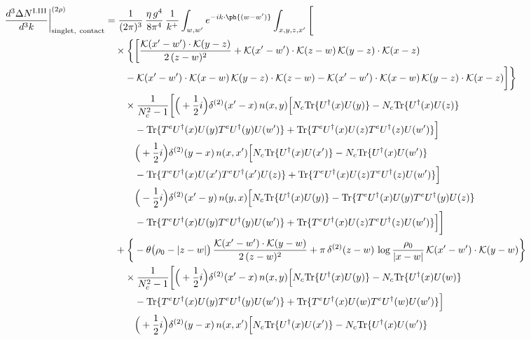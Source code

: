 \begin{align}
\frac{d^{3}\Delta N^{\rm I.III}}{d^{3}k}\bigg|^{(2\rho)}_{\rm singlet,\ contact}&=\frac{1}{(2\pi)^{3}}\,\frac{\eta\,g^{4}}{8\pi^{4}}\,\frac{1}{k^{+}}\int_{w,w'}e^{-ik\cdot\ph{(w-w')}}\int_{x,y,z,x'}\Bigg[\notag\\
&\quad\times\bigg\{\bigg[\frac{\mathcal{K}(x'-w')\cdot\mathcal{K}(y-z)}{2\,(z-w)^{2}}+\mathcal{K}(x'-w')\cdot\mathcal{K}(z-w)\,\mathcal{K}(y-z)\cdot\mathcal{K}(x-z)\notag\\
&\qquad-\mathcal{K}(x'-w')\cdot\mathcal{K}(x-w)\,\mathcal{K}(y-z)\cdot\mathcal{K}(z-w)-\mathcal{K}(x'-w')\cdot\mathcal{K}(x-w)\,\mathcal{K}(y-z)\cdot\mathcal{K}(x-z)\bigg]\bigg\}\notag\\
&\qquad\times \frac{1}{N_{c}^{2}-1}\bigg[\Big(+\frac{1}{2}i\Big)\delta^{(2)}(x'-x)\,n(x,y)\Big[N_{c}{\rm Tr}\{U^{\dagger}(x)U(y)\}-N_{c}{\rm Tr}\{U^{\dagger}(x)U(z)\}\notag\\
&\qquad\quad -{\rm Tr}\{T^{e}U^{\dagger}(x)U(y)T^{e}U^{\dagger}(y)U(w')\}+{\rm Tr}\{T^{e}U^{\dagger}(x)U(z)T^{e}U^{\dagger}(z)U(w')\}\Big]\notag\\
&\qquad\quad \Big(+\frac{1}{2}i\Big)\delta^{(2)}(y-x)\,n(x,x')\Big[N_{c}{\rm Tr}\{U^{\dagger}(x)U(x')\}-N_{c}{\rm Tr}\{U^{\dagger}(x)U(w')\}\notag\\
&\qquad\quad -{\rm Tr}\{T^{e}U^{\dagger}(x)U(x')T^{e}U^{\dagger}(x')U(z)\}+{\rm Tr}\{T^{e}U^{\dagger}(x)U(z)T^{e}U^{\dagger}(z)U(w')\}\Big]\notag\\
&\qquad\quad \Big(-\frac{1}{2}i\Big)\delta^{(2)}(x'-y)\,n(y,x)\Big[N_{c}{\rm Tr}\{U^{\dagger}(x)U(y)\}-{\rm Tr}\{T^{e}U^{\dagger}(x)U(y)T^{e}U^{\dagger}(y)U(z)\}\notag\\
&\qquad\quad -{\rm Tr}\{T^{e}U^{\dagger}(x)U(y)T^{e}U^{\dagger}(y)U(w')\}+{\rm Tr}\{T^{e}U^{\dagger}(x)U(z)T^{e}U^{\dagger}(z)U(w')\}\Big]\bigg]\notag\\
&\quad+\bigg\{-\theta\big(\rho_{0}-|z-w|\big)\,\frac{\mathcal{K}(x'-w')\cdot\mathcal{K}(y-w)}{2\,(z-w)^{2}}+\pi\,\delta^{(2)}(z-w)\,\log\frac{\rho_{0}}{|x-w|}\,\mathcal{K}(x'-w')\cdot\mathcal{K}(y-w)\bigg\}\notag\\
&\qquad\times \frac{1}{N_{c}^{2}-1}\bigg[\Big(+\frac{1}{2}i\Big)\delta^{(2)}(x'-x)\,n(x,y)\Big[N_{c}{\rm Tr}\{U^{\dagger}(x)U(y)\}-N_{c}{\rm Tr}\{U^{\dagger}(x)U(w)\}\notag\\
&\qquad\quad -{\rm Tr}\{T^{e}U^{\dagger}(x)U(y)T^{e}U^{\dagger}(y)U(w')\}+{\rm Tr}\{T^{e}U^{\dagger}(x)U(w)T^{e}U^{\dagger}(w)U(w')\}\Big]\notag\\
&\qquad\quad \Big(+\frac{1}{2}i\Big)\delta^{(2)}(y-x)\,n(x,x')\Big[N_{c}{\rm Tr}\{U^{\dagger}(x)U(x')\}-N_{c}{\rm Tr}\{U^{\dagger}(x)U(w')\}\notag\\

\end{align}
